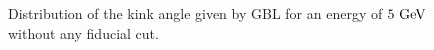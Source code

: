 
   
   \begin{figure}
     \centering
     \caption{Distribution of the kink angle given by GBL for an energy of $5~\rm{GeV}$ without any fiducial cut.}
     \label{fig:kinkAngle}
   \end{figure} 






